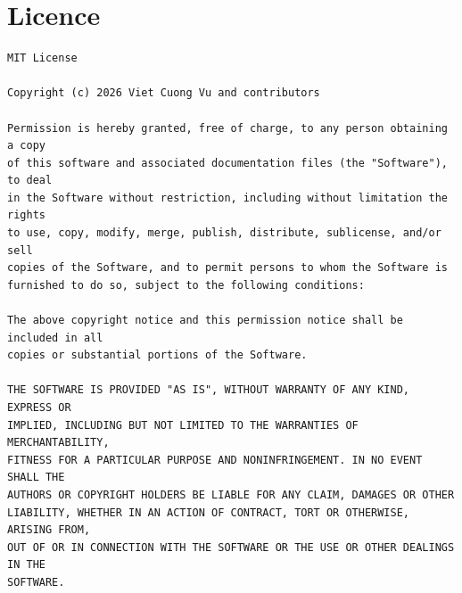 \documentclass[a4paper,10pt]{article}
\begin{document}
\section{Licence}
\begin{Verbatim}
MIT License

Copyright (c) 2026 Viet Cuong Vu and contributors

Permission is hereby granted, free of charge, to any person obtaining a copy
of this software and associated documentation files (the "Software"), to deal
in the Software without restriction, including without limitation the rights
to use, copy, modify, merge, publish, distribute, sublicense, and/or sell
copies of the Software, and to permit persons to whom the Software is
furnished to do so, subject to the following conditions:

The above copyright notice and this permission notice shall be included in all
copies or substantial portions of the Software.

THE SOFTWARE IS PROVIDED "AS IS", WITHOUT WARRANTY OF ANY KIND, EXPRESS OR
IMPLIED, INCLUDING BUT NOT LIMITED TO THE WARRANTIES OF MERCHANTABILITY,
FITNESS FOR A PARTICULAR PURPOSE AND NONINFRINGEMENT. IN NO EVENT SHALL THE
AUTHORS OR COPYRIGHT HOLDERS BE LIABLE FOR ANY CLAIM, DAMAGES OR OTHER
LIABILITY, WHETHER IN AN ACTION OF CONTRACT, TORT OR OTHERWISE, ARISING FROM,
OUT OF OR IN CONNECTION WITH THE SOFTWARE OR THE USE OR OTHER DEALINGS IN THE
SOFTWARE.
\end{Verbatim}
\clearpage
\printindex
\end{document}
